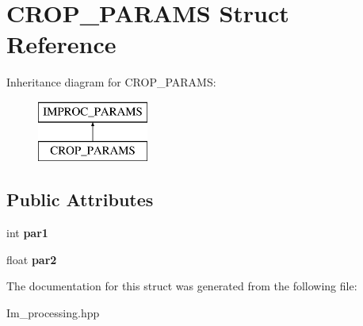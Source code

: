 \hypertarget{struct_c_r_o_p___p_a_r_a_m_s}{\section{C\+R\+O\+P\+\_\+\+P\+A\+R\+A\+M\+S Struct Reference}
\label{struct_c_r_o_p___p_a_r_a_m_s}
}
Inheritance diagram for C\+R\+O\+P\+\_\+\+P\+A\+R\+A\+M\+S\+:\begin{figure}[H]
\begin{center}
\leavevmode
\includegraphics[height=2.000000cm]{struct_c_r_o_p___p_a_r_a_m_s}
\end{center}
\end{figure}
\subsection*{Public Attributes}
\begin{DoxyCompactItemize}
\item 
\hypertarget{struct_c_r_o_p___p_a_r_a_m_s_a2c691b79b6a12648ad3468bbb594a373}{int {\bfseries par1}}\label{struct_c_r_o_p___p_a_r_a_m_s_a2c691b79b6a12648ad3468bbb594a373}

\item 
\hypertarget{struct_c_r_o_p___p_a_r_a_m_s_afe374993a90303a45b0db511388c2d58}{float {\bfseries par2}}\label{struct_c_r_o_p___p_a_r_a_m_s_afe374993a90303a45b0db511388c2d58}

\end{DoxyCompactItemize}


The documentation for this struct was generated from the following file\+:\begin{DoxyCompactItemize}
\item 
Im\+\_\+processing.\+hpp\end{DoxyCompactItemize}
